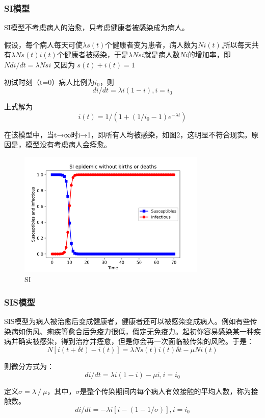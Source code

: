 \documentclass[12pt]{report}
\begin{document}
	\setcounter{secnumdepth}{3}\subsubsection{SI模型}
	SI模型不考虑病人的治愈，只考虑健康者被感染成为病人。
	\par\setlength\parindent{2em}假设，每个病人每天可使$\lambda s(t)$个健康者变为患者，病人数为$Ni(t)$,所以每天共有$\lambda Ns(t)i(t)$个健康者被感染，于是$\lambda Nsi$就是病人数$Ni$的增加率，即
	$N di/dt=\lambda Nsi$
	又因为
	$s(t)+i(t)=1$
	
	初试时刻（t=0）病人比例为$i_0$，则
	$$di/dt=λi(1-i),i=i_0$$
	
	上式解为
	$$i(t)=1/(1+(1/i_0 -1)e^{-\lambda t} )$$
	
	在该模型中，当t→∞时i→1，即所有人均被感染，如图2，这明显不符合现实。原因是，模型没有考虑病人会痊愈。
	
	
	\begin{figure}
		\centering
		\includegraphics[width=0.8\textwidth]{img/SI.png}
		\caption{SI} 
		\label{img}
	\end{figure}
	\setcounter{secnumdepth}{3}\subsubsection{SIS模型}
	SIS模型为病人被治愈后变成健康者，健康者还可以被感染变成病人。例如有些传染病如伤风、痢疾等愈合后免疫力很低，假定无免疫力。起初你容易感染某一种疾病并确实被感染，得到治疗并痊愈，但是你会再一次面临被传染的风险。于是：
	$$N[i(t+\delta t)-i(t)]=\lambda Ns(t)i(t)\delta t-\mu Ni(t)$$
	
	则微分方式为：
	$$di/dt=\lambda i(1-i)-\mu i,i=i_0$$
	
	定义$\sigma=\lambda ⁄\mu$，其中，$\sigma$是整个传染期间内每个病人有效接触的平均人数，称为接触数。
	$$di/dt=-\lambda i[i-(1-1/\sigma)],i=i_0$$
\end{document}
